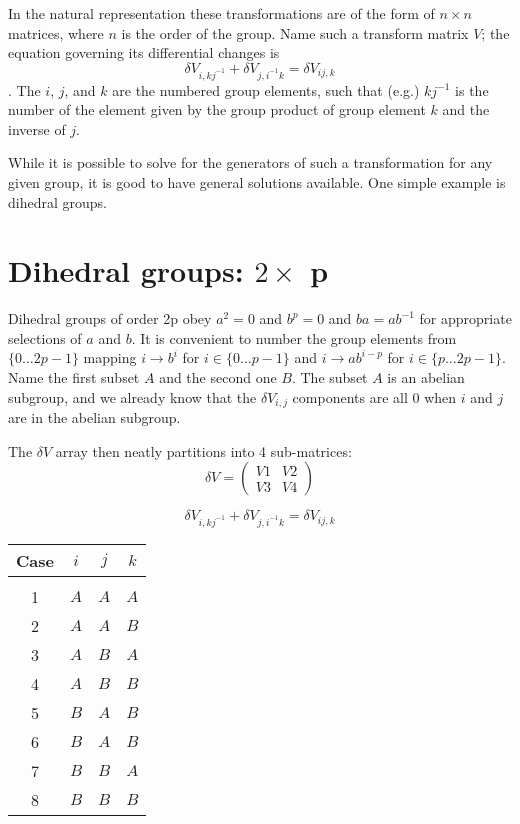 \documentclass{revtex4-1}
\begin{document}
\par In the natural representation these transformations are of the form of $n \times n$ matrices, where $n$ is the
order of the group.  Name such a transform matrix $V$; the equation governing its differential
changes is $$\delta V_{i,kj^{-1}} + \delta V_{j,i^{-1}k} = \delta V_{ij,k}$$.  The $i$, $j$, and $k$ are the numbered group elements, 
such that (e.g.) $kj^{-1}$ is the number of the element given by the group product of group element $k$ and the inverse of $j$.

\par While it is possible to solve for the generators of such a transformation for any given
group, it is good to have general solutions available.  One simple example is dihedral groups.

\section{Dihedral groups:  $2 \times$ p}
Dihedral groups of order 2p obey $a^2=0$ and $b^p=0$
and $ba=ab^{-1}$ for appropriate selections of $a$ and $b$.  It is convenient
to number the group elements from $\{0\dots 2p-1\}$ mapping $i \rightarrow b^i$ for 
$i \in \{0\dots p-1\}$ and $i \rightarrow ab^{i-p}$ for $i \in \{p\dots 2p-1\}$.
Name the first subset $A$ and the second one $B$.   The subset $A$ is an abelian subgroup,
and we already know that the $\delta V_{i,j}$ components are all $0$ when $i$ and $j$ are
in the abelian subgroup.

\par The $\delta V$ array then neatly partitions into 4 sub-matrices:
\begin{equation}
\delta V = \left(\begin{array}{cc} V1 & V2 \\ V3 & V4
\end{array}\right)
\end{equation}

$$\delta V_{i,kj^{-1}} + \delta V_{j,i^{-1}k} = \delta V_{ij,k}$$

\begin{tabular}{c|ccc}
Case & $i$ & $j$ & $k$ \\ \hline \\
1 & $A$ & $A$ & $A$ \\
2 & $A$ & $A$ & $B$ \\
3 & $A$ & $B$ & $A$ \\
4 & $A$ & $B$ & $B$ \\
5 & $B$ & $A$ & $B$ \\
6 & $B$ & $A$ & $B$ \\
7 & $B$ & $B$ & $A$ \\
8 & $B$ & $B$ & $B$ 
\end{tabular}
\end{document}
